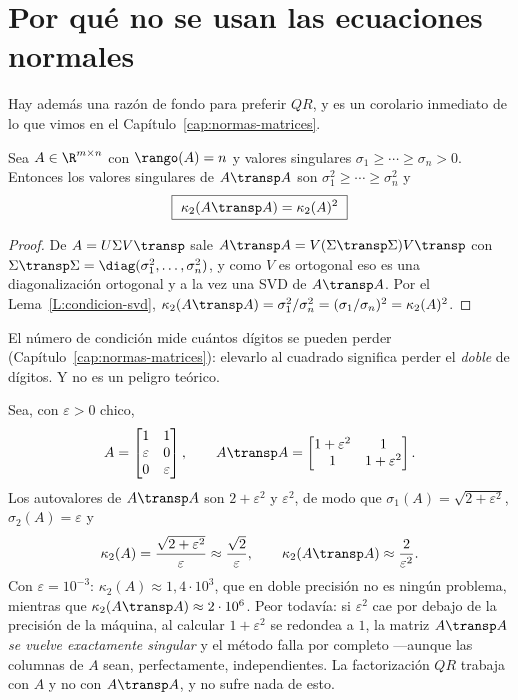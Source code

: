 \section{Por qué no se usan las ecuaciones normales}\label{mc-sec:condicion}

Hay además una razón de fondo para preferir $QR$, y es un corolario inmediato
de lo que vimos en el Capítulo~\ref{cap:normas-matrices}.

\begin{proposition}\label{mc-prop:condicion}
Sea $A\in\R^{m\times n}$ con $\rango(A)=n$ y valores singulares
$\sigma_1\ge\cdots\ge\sigma_n>0$. Entonces los valores singulares de
$A\transp A$ son $\sigma_1^2\ge\cdots\ge\sigma_n^2$ y
\[
\boxed{\ \kappa_2(A\transp A)=\kappa_2(A)^2\ }
\]
\end{proposition}

\begin{proof}
De $A=U\Sigma V\transp$ sale $A\transp A=V(\Sigma\transp\Sigma)V\transp$ con
$\Sigma\transp\Sigma=\diag(\sigma_1^2,\dots,\sigma_n^2)$, y como $V$ es
ortogonal eso es una diagonalización ortogonal y a la vez una SVD de
$A\transp A$. Por el Lema~\ref{L:condicion-svd},
$\kappa_2(A\transp A)=\sigma_1^2/\sigma_n^2=(\sigma_1/\sigma_n)^2=\kappa_2(A)^2$.
\end{proof}

El número de condición mide cuántos dígitos se pueden perder
(Capítulo~\ref{cap:normas-matrices}): elevarlo al cuadrado
significa perder el \emph{doble} de dígitos. Y no es un peligro teórico.

\begin{example}\label{mc-ej:eps}
Sea, con $\varepsilon>0$ chico,
\[
A=\begin{bmatrix}1&1\\ \varepsilon&0\\ 0&\varepsilon\end{bmatrix},
\qquad
A\transp A=\begin{bmatrix}1+\varepsilon^2&1\\ 1&1+\varepsilon^2\end{bmatrix}.
\]
Los autovalores de $A\transp A$ son $2+\varepsilon^2$ y $\varepsilon^2$, de
modo que $\sigma_1(A)=\sqrt{2+\varepsilon^2}$, $\sigma_2(A)=\varepsilon$ y
\[
\kappa_2(A)=\frac{\sqrt{2+\varepsilon^2}}{\varepsilon}\approx\frac{\sqrt2}{\varepsilon},
\qquad
\kappa_2(A\transp A)\approx\frac{2}{\varepsilon^2}.
\]
Con $\varepsilon=10^{-3}$: $\kappa_2(A)\approx1{,}4\cdot10^{3}$, que en doble
precisión no es ningún problema, mientras que
$\kappa_2(A\transp A)\approx2\cdot10^{6}$. Peor todavía: si $\varepsilon^2$
cae por debajo de la precisión de la máquina, al calcular $1+\varepsilon^2$ se
redondea a $1$, la matriz $A\transp A$ \emph{se vuelve exactamente singular} y
el método falla por completo ---aunque las columnas de $A$ sean,
perfectamente, independientes. La factorización $QR$ trabaja con $A$ y no con
$A\transp A$, y no sufre nada de esto.
\end{example}

